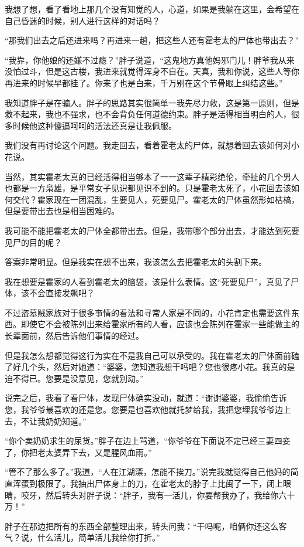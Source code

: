 我想了想，看了看地上那几个没有知觉的人，心道，如果是我躺在这里，会希望在自己昏迷的时候，别人进行这样的对话吗？

“那我们出去之后还进来吗？再进来一趟，把这些人还有霍老太的尸体也带出去？”

“我靠，你他娘的还嫌不过瘾？”胖子说道，“这鬼地方真他妈邪门儿！胖爷我从来没怕过斗，但是这古楼，我进来就觉得浑身不自在。天真，我和你说，这些人等你再进来的时候早都挂了。你来了也是白来，千万别在这个节骨眼上纠结这些。”

我知道胖子是在骗人。胖子的思路其实很简单一我先尽力救，这是第一原则，但是救不起来，我也不强求，也不会背负任何道德约束。胖子是活得相当明白的人，很多时候他这种傻逼呵呵的活法还真是让我佩服。

我们没有再讨论这个问题。我走回去，看着霍老太的尸体，就想着回去该如何对小花说。

当然，其实霍老太真的已经活得相当够本了一一这辈子精彩绝伦，牵扯的几个男人也都是一方枭雄，是平常女子见识都见识不到的。只是霍老太死了，小花回去该如何交代？霍家现在一团混乱，生要见人，死要见尸。霍老太的尸体虽然形如枯槁，但是要带出去也是相当困难的。

我可能不能把霍老太的尸体全都带出去。但是，我带哪个部分出去，才能达到死要见尸的目的呢？

答案非常明显。但是我实在想不出来，我该怎么去把霍老太的头割下来。

我在想要是霍家的人看到霍老太的脑袋，该是什么表情。这“死要见尸”，真见了尸体，该不会直接发飙吧？

不过盗墓贼家族对于很多亊情的看法和寻常人家是不同的，小花肯定也需要这件东西。即使它不会被陈列出来给霍家所有的人看，应该也会陈列在霍家一些能做主的长辈面前，然后告诉他们事情的经过。

但是我怎么想都觉得这行为实在不是我自己可以承受的。我在霍老太的尸体面前磕了好几个头，然后对她道：“婆婆，您知道我想干吗吧？您也很疼小花。我真的是迫不得已。您要是没意见，您就别动。”

说完之后，我看了看尸体，发现尸体确实没动，就道：“谢谢婆婆，我偷偷告诉您，我爷爷最喜欢的还是您。您要是也喜欢他就托梦给我，我把您埋我爷爷边上去，不让我奶奶知道。”

“你个卖奶奶求生的尿货。”胖子在边上骂道，“你爷爷在下面说不定已经三妻四妾了，你把老太婆弄下去，又是腥风血雨。”

“管不了那么多了。”我道，“人在江湖漂，怎能不挨刀。”说完我就觉得自己他妈的简直浑蛋到极限了。我抽出尸体身上的刀，在霍老太的脖子上比闽了一下，闭上眼睛，咬牙，然后转头对胖子说：“胖子，我有一活儿，你要帮我办了，我给你六十万！”

胖子在那边把所有的东西全部整理出来，转头问我：“干吗呢，咱俩你还这么客气？说，什么活儿，简单活儿我给你打折。”

